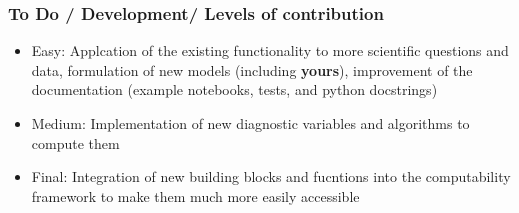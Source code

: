 \documentclass[36pt]{article}
\begin{document}
\begin{tcbposter}
{  \subsubsection*{To Do / Development/ Levels of contribution}
  \begin{itemize}
    \item Easy:
      Applcation of the existing functionality to more scientific questions and data,
      formulation of new models (including {\bf yours}), 
      improvement of the documentation (example notebooks, tests, and python docstrings)
    \item Medium:
      Implementation of new diagnostic variables and algorithms to compute them 
    \item Final:
      Integration of new building blocks and fucntions into the computability framework
      to make them much more easily accessible
  \end{itemize}
}
%  
%  
\end{tcbposter}
\end{document}

